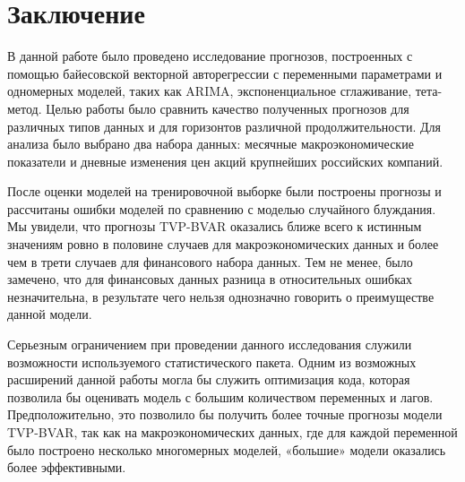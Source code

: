 \section*{Заключение}
\label{sec:concl}

В данной работе было проведено исследование прогнозов, построенных с помощью байесовской векторной авторегрессии с переменными параметрами и одномерных моделей, таких как ARIMA, экспоненциальное сглаживание, тета-метод. Целью работы было сравнить качество полученных прогнозов для различных типов данных и для горизонтов различной продолжительности. Для анализа было выбрано два набора данных: месячные макроэкономические показатели и дневные изменения цен акций крупнейших российских компаний.

После оценки моделей на тренировочной выборке были построены прогнозы и рассчитаны ошибки моделей по сравнению с моделью случайного блуждания. Мы увидели, что прогнозы TVP-BVAR оказались ближе всего к истинным значениям ровно в половине случаев для макроэкономических данных и более чем в трети случаев для финансового набора данных. Тем не менее, было замечено, что для финансовых данных разница в относительных ошибках незначительна, в результате чего нельзя однозначно говорить о преимуществе данной модели.

Серьезным ограничением при проведении данного исследования служили возможности используемого статистического пакета. Одним из возможных расширений данной работы могла бы служить оптимизация кода, которая позволила бы оценивать модель с большим количеством переменных и лагов. Предположительно, это позволило бы получить более точные прогнозы модели TVP-BVAR, так как на макроэкономических данных, где для каждой переменной было построено несколько многомерных моделей, «большие» модели оказались более эффективными.
